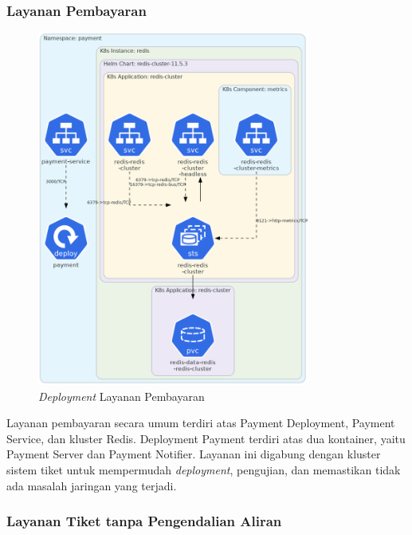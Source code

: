 \pagebreak

\subsubsection{Layanan Pembayaran}

\begin{figure}[htbp]
    \centering
    \includegraphics[width=0.8\textwidth]{resources/chapter-4/payment.png}
    \caption{\textit{Deployment} Layanan Pembayaran}
    \label{fig:deployment-payment}
\end{figure}

Layanan pembayaran secara umum terdiri atas Payment Deployment, Payment Service, dan kluster Redis. Deployment Payment terdiri atas dua kontainer, yaitu Payment Server dan Payment Notifier. Layanan ini digabung dengan kluster sistem tiket untuk mempermudah \textit{deployment}, pengujian, dan memastikan tidak ada masalah jaringan yang terjadi.

\pagebreak

\subsubsection{Layanan Tiket tanpa Pengendalian Aliran}

